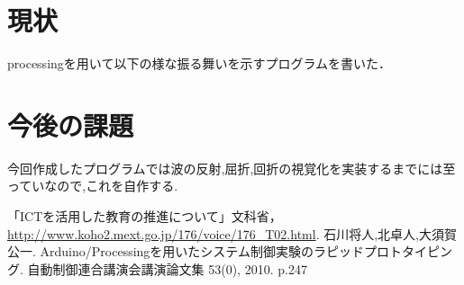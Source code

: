 \documentclass[a4j,twocolumn,uplatex]{jarticle}
\begin{document}
\section{現状}
processingを用いて以下の様な振る舞いを示すプログラムを書いた．


\section{今後の課題}
今回作成したプログラムでは波の反射,屈折,回折の視覚化を実装するまでには至っていなので,これを自作する.


\begin{thebibliography}{9}
「ICTを活用した教育の推進について」文科省，\url{http://www.koho2.mext.go.jp/176/voice/176_T02.html}.
 石川将人,北卓人,大須賀公一. Arduino/Processingを用いたシステム制御実験のラピッドプロトタイピング. 自動制御連合講演会講演論文集 53(0), 2010. p.247 

\end{thebibliography}
\end{document}
